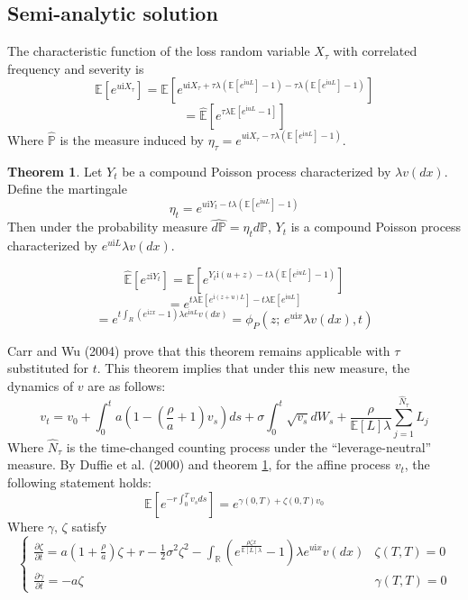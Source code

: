\documentclass{article}
\theoremstyle{definition}
\newtheorem{theorem}{Theorem}
\newenvironment{sketchproof}{%
  \renewcommand{\proofname}{Sketch of Proof}\proof}{\endproof}
\begin{document}
\subsection{Semi-analytic solution}
The characteristic function of the loss random variable \(X_\tau\) with correlated frequency and severity is 
\[\mathbb{E}[e^{u\mathrm{i}X_\tau}]=\mathbb{E}\left[e^{u\mathrm{i}X_\tau+ \tau \lambda  \left(\mathbb{E}\left[e^{\mathrm{i}uL}\right]-1\right)- \tau \lambda \left(\mathbb{E}\left[e^{\mathrm{i}uL}\right]-1\right)}\right]\]
\[=\mathbb{\hat{E}} \left[e^{\tau \lambda \mathbb{E}\left[e^{\mathrm{i}uL}-1\right]}\right]\]
Where \(\mathbb{\hat{P}}\) is the measure induced by \(\eta_\tau=e^{u\mathrm{i}X_\tau- \tau\lambda \left(\mathbb{E}\left[e^{\mathrm{i}uL}\right]-1\right)}\).  
\begin{theorem}\label{theorem1}
Let \(Y_t\) be a compound Poisson process characterized by \(\lambda v(dx)\).  Define the martingale
\begin{equation}\eta_t=e^{u\mathrm{i}Y_t- t\lambda \left(\mathbb{E}\left[e^{\mathrm{i}uL}\right]-1\right)}\end{equation}
Then under the probability measure \(\hat{d\mathbb{P}}=\eta_t d\mathbb{P}\), \(Y_t\) is a compound Poisson process characterized by \(e^{u\mathrm{i}L}\lambda v(dx)\).
\end{theorem}
\begin{sketchproof}
\[\mathbb{\hat{E}}\left[e^{z\mathrm{i}Y_t}\right]=\mathbb{E}\left[e^{Y_t \mathrm{i} (u+z)-t\lambda \left(\mathbb{E}\left[e^{\mathrm{i}uL}\right]-1\right)}\right]\]
\[=e^{t\lambda \mathbb{E}\left[e^{\mathrm{i}(z+u)L}\right]-t\lambda \mathbb{E}\left[e^{\mathrm{i}uL}\right]}\]
\[=e^{t \int_{R} \left(e^{\mathrm{i}zx}-1\right)\lambda e^{\mathrm{i}uL}v(dx)}=\phi_{P} (z;\,e^{u\mathrm{i}x}\lambda v(dx), t)\]
\end{sketchproof}

Carr and Wu (2004) prove that this theorem remains applicable with \(\tau\) substituted for \(t\).  This theorem implies that under this new measure, the dynamics of \(v\) are as follows:
\begin{equation}\label{tmcLN}v_t=v_0+\int_0 ^t a\left(1-\left(\frac{\rho}{a}+1\right)v_s\right)ds+\sigma \int_0 ^ t \sqrt{v_s} dW_s +\frac{\rho}{\mathbb{E}[L] \lambda} \sum_{j=1} ^ {\hat{N}_\tau} L_j \end{equation}
Where \(\hat{N}_\tau\) is the time-changed counting process under the ``leverage-neutral'' measure.   By Duffie et al. (2000) and theorem \ref{theorem1}, for the affine process \(v_t\), the following statement holds:
\[\mathbb{E} \left[e^{-r\int_0 ^ {T} v_s ds}\right]=e^{\gamma(0, T)+\zeta(0, T)v_0}\]
Where \(\gamma,\,\zeta\) satisfy
\[
\begin{cases}
\frac{\partial \zeta}{\partial t}=a\left(1+\frac{\rho}{a}\right) \zeta+r-\frac{1}{2} \sigma^2 \zeta^2 - \int_{\mathbb{R}} \left(e^{\frac{\rho \zeta x}{\mathbb{E}[L] \lambda}}-1\right)\lambda e^{u\mathrm{i}x} v(dx) & \zeta(T, T)=0\\
\frac{\partial \gamma}{\partial t}=-a \zeta & \gamma(T, T)=0
\end{cases} \]
\end{document}
